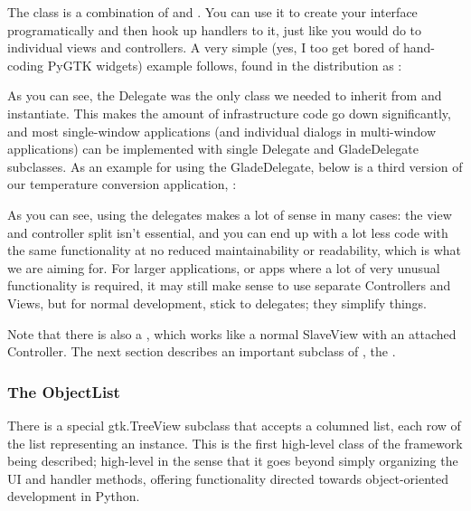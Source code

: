 \documentclass[a4paper]{howto}
\begin{document}
The  class is a combination of  and
. You can use it to create your interface
programatically and then hook up handlers to it, just like you would do
to individual views and controllers. A very simple (yes, I too get bored
of hand-coding PyGTK widgets) example follows, found in the distribution
as :




As you can see, the Delegate was the only class we needed to inherit
from and instantiate. This makes the amount of infrastructure code go
down significantly, and most single-window applications (and individual
dialogs in multi-window applications) can be implemented with single
Delegate and GladeDelegate subclasses. As an example for using the
GladeDelegate, below is a third version of our temperature conversion
application, :



As you can see, using the delegates makes a lot of sense in many cases:
the view and controller split isn't essential, and you can end up
with a lot less code with the same functionality at no reduced
maintainability or readability, which is what we are aiming for. For
larger applications, or apps where a lot of very unusual functionality
is required, it may still make sense to use separate Controllers and
Views, but for normal development, stick to delegates; they simplify
things.

Note that there is also a , which works like a
normal SlaveView with an attached Controller. The next section describes
an important subclass of , the
.

\subsubsection{The ObjectList}

There is a special gtk.TreeView subclass that accepts a columned list,
each row of the list representing an instance. This is the first
high-level class of the framework being described; high-level in the
sense that it goes beyond simply organizing the UI and handler methods,
offering functionality directed towards object-oriented development in
Python.
\end{document}
